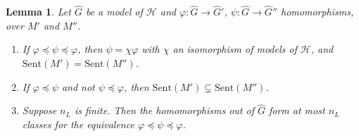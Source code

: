 \documentclass[11pt]{amsart}
\newtheorem{lem}[thm]{Lemma}
\theoremstyle{definition}
\newcommand{\Sent}{\mathrm{Sent}}
\newcommand{\cH}{\mathcal H}
\begin{document}
\begin{lem}\label{lem:classes}
Let $\hat G$ be a model of $\cH$ and $\varphi\colon\hat G\to\hat G'$,
$\psi\colon\hat G\to\hat G''$ homomorphisms, over $M'$ and $M''$.
\begin{enumerate}
\item[(a)] If $\varphi\preceq\psi\preceq\varphi$, then
$\psi=\chi\varphi$ with $\chi$ an isomorphism of models of $\cH$, and
$\Sent(M')=\Sent(M'')$.
\item[(b)] If $\varphi\preceq\psi$ and not $\psi\preceq\varphi$, then
$\Sent(M')\subsetneq\Sent(M'')$.
\item[(c)] Suppose $n_L$ is finite. Then the homomorphisms out of
$\hat G$ form at most $n_L$ classes for the equivalence
$\varphi\preceq\psi\preceq\varphi$.
\end{enumerate}
\end{lem}
\end{document}
